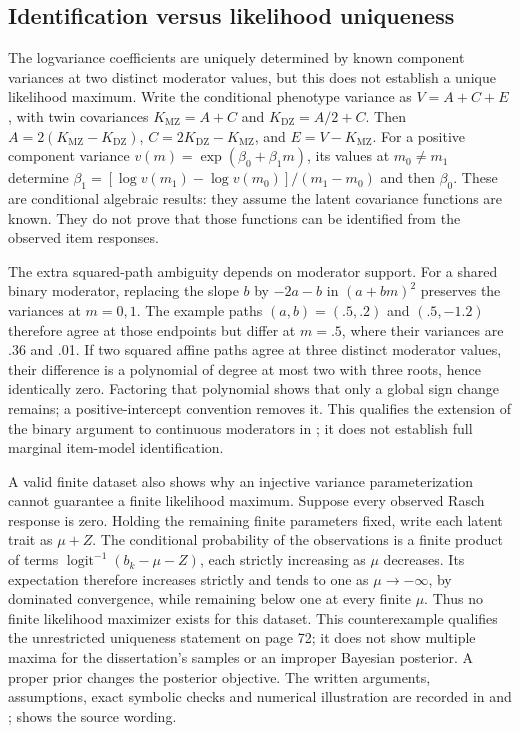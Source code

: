 \subsection{Identification versus likelihood uniqueness}
The logvariance coefficients are uniquely determined by known component variances at two distinct moderator values, but this does not establish a unique likelihood maximum. Write the conditional phenotype variance as $V=A+C+E$, with twin covariances $K_{\mathrm{MZ}}=A+C$ and $K_{\mathrm{DZ}}=A/2+C$. Then $A=2(K_{\mathrm{MZ}}-K_{\mathrm{DZ}})$, $C=2K_{\mathrm{DZ}}-K_{\mathrm{MZ}}$, and $E=V-K_{\mathrm{MZ}}$. For a positive component variance $v(m)=\exp(\beta_0+\beta_1m)$, its values at $m_0\ne m_1$ determine $\beta_1=[\log v(m_1)-\log v(m_0)]/(m_1-m_0)$ and then $\beta_0$. These are conditional algebraic results: they assume the latent covariance functions are known. They do not prove that those functions can be identified from the observed item responses.

The extra squared-path ambiguity depends on moderator support. For a shared binary moderator, replacing the slope $b$ by $-2a-b$ in $(a+bm)^2$ preserves the variances at $m=0,1$. The example paths $(a,b)=(.5,.2)$ and $(.5,-1.2)$ therefore agree at those endpoints but differ at $m=.5$, where their variances are .36 and .01. If two squared affine paths agree at three distinct moderator values, their difference is a polynomial of degree at most two with three roots, hence identically zero. Factoring that polynomial shows that only a global sign change remains; a positive-intercept convention removes it. This qualifies the extension of the binary argument to continuous moderators in \citet[Appendix C, pp.\ 138--139]{schwabe2016}; it does not establish full marginal item-model identification.

A valid finite dataset also shows why an injective variance parameterization cannot guarantee a finite likelihood maximum. Suppose every observed Rasch response is zero. Holding the remaining finite parameters fixed, write each latent trait as $\mu+Z$. The conditional probability of the observations is a finite product of terms $\operatorname{logit}^{-1}(b_k-\mu-Z)$, each strictly increasing as $\mu$ decreases. Its expectation therefore increases strictly and tends to one as $\mu\to-\infty$, by dominated convergence, while remaining below one at every finite $\mu$. Thus no finite likelihood maximizer exists for this dataset. This counterexample qualifies the unrestricted uniqueness statement on page 72; it does not show multiple maxima for the dissertation's samples or an improper Bayesian posterior. A proper prior changes the posterior objective. The written arguments, assumptions, exact symbolic checks and numerical illustration are recorded in  and ;  shows the source wording.


